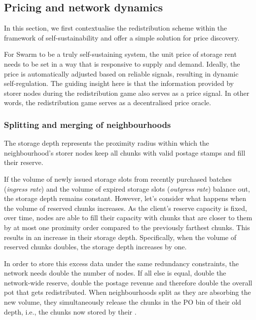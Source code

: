\subsection{Pricing and network dynamics}\label{sec:price-oracle}

In this section, we first contextualise the redistribution scheme within the framework of self-sustainability and offer a simple solution for price discovery.

For Swarm to be a truly self-sustaining system, the unit price of storage rent needs to be set in a way that is responsive to supply and demand. Ideally, the price is automatically adjusted based on reliable signals, resulting in dynamic self-regulation. The guiding insight here is that the information provided by storer nodes during the redistribution game also serves as a price signal. In other words, the redistribution game serves as a decentralised price oracle.



\subsubsection{Splitting and merging of neighbourhoods}

The storage depth represents the proximity radius within which the neighbourhood's storer nodes keep all chunks with valid postage stamps and fill their reserve. 


If the volume of newly issued storage slots from recently purchased batches (\emph{ingress rate}\/) and the volume of expired storage slots (\emph{outgress rate}\/) balance out, the storage depth remains constant.
However, let's consider what happens when the volume of reserved chunks increases.
As the client's reserve capacity is fixed, over time, nodes are able to fill their capacity with chunks that are closer to them by at most one proximity order compared to the previously farthest chunks. This results in an increase in their storage depth.
Specifically, when the volume of reserved chunks doubles,  the storage depth increases by one.  

In order to store this excess data under the same redundancy constraints, the network needs double the number of nodes. If all else is equal, double the network-wide reserve, double the postage revenue and therefore double the overall pot that gets redistributed. When neighbourhoods split as they are absorbing the new volume, they simultaneously release the chunks in the PO bin of their old depth, i.e., the chunks now stored by their . 

